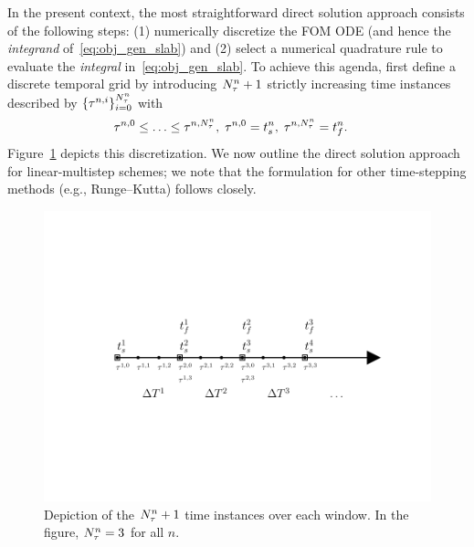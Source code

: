In the present context, the most straightforward direct solution approach consists of the 
following steps: (1) numerically discretize the FOM ODE (and hence the \textit{integrand} of~\eqref{eq:obj_gen_slab}) and 
(2) select a numerical quadrature rule to evaluate the \textit{integral} in~\eqref{eq:obj_gen_slab}.
To achieve this agenda, first define a discrete temporal grid 
by introducing
$N_{\tau}^{n}+1$ strictly increasing time instances described by
$\{\tau^{n,i}\}_{i=0}^{N_{\tau}^{n}}$ with
\begin{align}
&\tau^{n,0} \le \ldots \le \tau^{n,N_{\tau}^{n}} , \label{eq:timegrid1} \;
\tau^{n,0} = t_s^{n},\;
\tau^{n,N_{\tau}^{n}} = t_f^{n} . 
\end{align}
Figure~\ref{fig:slab_fig2} depicts this discretization.
We now outline the direct solution approach for linear-multistep schemes; we note that the formulation for
other time-stepping methods (e.g., Runge--Kutta) follows closely. 
\begin{figure} 
\begin{centering} 
\includegraphics[trim={0.0cm 5cm 0cm 3cm},clip,width=1.0\textwidth]{figs/time_grid_timesteps.pdf} 
	\caption{Depiction of the $N_{\tau}^{n}+1$ time instances over each window. In the figure, $N_{\tau}^{n} = 3$ for all $n$.} 
\label{fig:slab_fig2} 
\end{centering} 
\end{figure}

